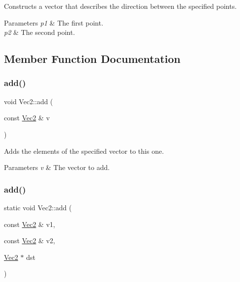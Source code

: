Constructs a vector that describes the direction between the specified points.


\begin{DoxyParams}{Parameters}
{\em p1} & The first point. \\
\hline
{\em p2} & The second point. \\
\hline
\end{DoxyParams}


\subsection{Member Function Documentation}
\mbox{\label{classVec2_a83705106dc5f7903512f26c09c317a21}} 
\subsubsection{\texorpdfstring{add()}{add()}\hspace{0.1cm}{\footnotesize\ttfamily [1/4]}}
{\footnotesize\ttfamily void Vec2\+::add (\begin{DoxyParamCaption}\item[{const \hyperlink{classVec2}{Vec2} \&}]{v }\end{DoxyParamCaption})\hspace{0.3cm}{\ttfamily [inline]}}

Adds the elements of the specified vector to this one.


\begin{DoxyParams}{Parameters}
{\em v} & The vector to add. \\
\hline
\end{DoxyParams}
\mbox{\label{classVec2_aba6e4df1c6af7b575fb4e501d39e39d1}} 
\subsubsection{\texorpdfstring{add()}{add()}\hspace{0.1cm}{\footnotesize\ttfamily [2/4]}}
{\footnotesize\ttfamily static void Vec2\+::add (\begin{DoxyParamCaption}\item[{const \hyperlink{classVec2}{Vec2} \&}]{v1,  }\item[{const \hyperlink{classVec2}{Vec2} \&}]{v2,  }\item[{\hyperlink{classVec2}{Vec2} $\ast$}]{dst }\end{DoxyParamCaption})\hspace{0.3cm}{\ttfamily [static]}}

